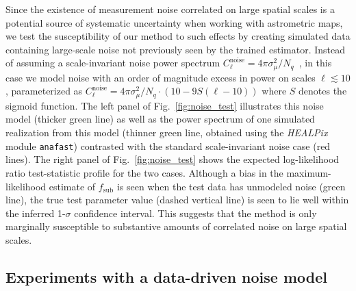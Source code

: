 \documentclass[twocolumn]{aastex631}
\newcommand{\package}[1]{\textsl{#1}\xspace}
\newcommand{\healpix}{\package{HEALPix}}
\begin{document}
Since the existence of measurement noise correlated on large spatial scales is a potential source of systematic uncertainty when working with astrometric maps, we test the susceptibility of our method to such effects by creating simulated data containing large-scale noise not previously seen by the trained estimator. Instead of assuming a scale-invariant noise power spectrum $C_\ell^\mathrm{noise} = 4\pi \sigma_{\mu}^2 / N_q$~\citep{Mishra-Sharma:2020ynk}, in this case we model noise with an order of magnitude excess in power on scales $\ell \lesssim 10$, parameterized as $C_\ell^\mathrm{noise} = 4\pi\sigma_{\mu}^2 / N_q \cdot \left(10 - 9 S(\ell - 10)\right)$ where $S$ denotes the sigmoid function.
The left panel of Fig.~\ref{fig:noise_test} illustrates this noise model (thicker green line) as well as the power spectrum of one simulated realization from this model (thinner green line, obtained using the \healpix module \texttt{anafast}) contrasted with the standard scale-invariant noise case (red lines). The right panel of Fig.~\ref{fig:noise_test} shows the expected log-likelihood ratio test-statistic profile for the two cases. Although a bias in the maximum-likelihood estimate of $f_\mathrm{sub}$ is seen when the test data has unmodeled noise (green line), the true test parameter value (dashed vertical line) is seen to lie well within the inferred 1-$\sigma$ confidence interval. This suggests that the method is only marginally susceptible to substantive amounts of correlated noise on large spatial scales.

\subsection{Experiments with a data-driven noise model}
\label{sec:dr2_noise}
\end{document}
